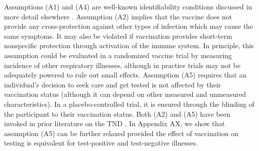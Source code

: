 \documentclass[11pt]{article}
\begin{document}
Assumptions (A1) and (A4) are well-known identifiability conditions discussed in more detail elsewhere \cite{hernan_causal_2020}. Assumption (A2) implies that the vaccine does not provide any cross-protection against other types of infection which may cause the same symptoms. It may also be violated if vaccination provides short-term nonspecific protection through activation of the immune system. In principle, this assumption could be evaluated in a randomized vaccine trial by measuring incidence of other respiratory illnesses, although in practice trials may not be adequately powered to rule out small effects. Assumption (A5) requires that an individual's decision to seek care and get tested is not affected by their vaccination status (although it can depend on other measured and unmeasured characteristics). In a placebo-controlled trial, it is ensured through the blinding of the participant to their vaccination status. Both (A2) and (A5) have been invoked in prior literature on the TND \cite{jackson_test-negative_2013,schnitzer_estimands_2022}. In Appendix AX, we show that assumption (A5) can be further relaxed provided the effect of vaccination on testing is equivalent for test-positive and test-negative illnesses.
\end{document}
